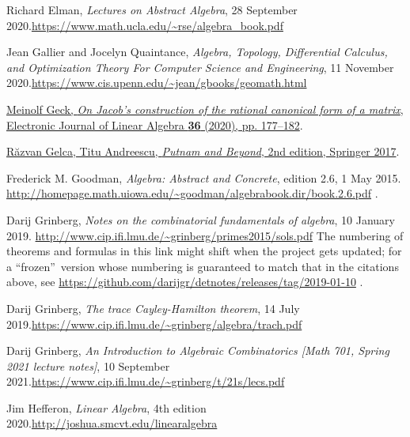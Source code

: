 \documentclass[numbers=enddot,12pt,final,onecolumn,notitlepage]{scrartcl}%
\numberwithin{exer}{subsection}
\theoremstyle{definition}
\begin{document}
\begin{thebibliography}{99999999}
Richard Elman, \textit{Lectures on Abstract
Algebra}, 28 September 2020.\newline\url{https://www.math.ucla.edu/~rse/algebra_book.pdf}

Jean Gallier and Jocelyn Quaintance,
\textit{Algebra, Topology, Differential Calculus, and Optimization Theory For
Computer Science and Engineering}, 11 November 2020.\newline\url{https://www.cis.upenn.edu/~jean/gbooks/geomath.html}

\href{https://doi.org/10.13001/ela.2020.5055}{Meinolf
Geck, \textit{On Jacob's construction of the rational canonical form of a
matrix}, Electronic Journal of Linear Algebra \textbf{36} (2020), pp.
177--182}.

%
\href{https://doi.org/10.1007/978-3-319-58988-6}{R\u{a}zvan Gelca, Titu
Andreescu, \textit{Putnam and Beyond}, 2nd edition, Springer 2017}.

Frederick M. Goodman, \textit{Algebra: Abstract and
Concrete}, edition 2.6, 1 May 2015.\newline%
\url{http://homepage.math.uiowa.edu/~goodman/algebrabook.dir/book.2.6.pdf} .

Darij Grinberg, \textit{Notes on the combinatorial
fundamentals of algebra}, 10 January 2019.\newline%
\url{http://www.cip.ifi.lmu.de/~grinberg/primes2015/sols.pdf} \newline The
numbering of theorems and formulas in this link might shift when the project
gets updated; for a \textquotedblleft frozen\textquotedblright\ version whose
numbering is guaranteed to match that in the citations above, see
\url{https://github.com/darijgr/detnotes/releases/tag/2019-01-10} .

Darij Grinberg, \textit{The trace Cayley-Hamilton
theorem}, 14 July 2019.\newline\url{https://www.cip.ifi.lmu.de/~grinberg/algebra/trach.pdf}

Darij Grinberg, \textit{An Introduction to Algebraic
Combinatorics [Math 701, Spring 2021 lecture notes]}, 10 September
2021.\newline\url{https://www.cip.ifi.lmu.de/~grinberg/t/21s/lecs.pdf}

Jim Hefferon, \textit{Linear Algebra}, 4th edition
2020.\newline\url{http://joshua.smcvt.edu/linearalgebra}


\end{thebibliography}
\end{document}
